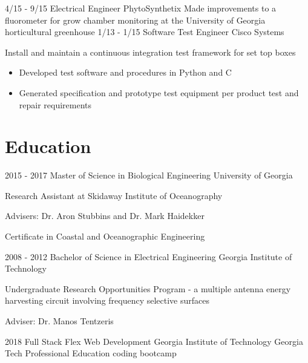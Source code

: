 \documentclass[]{cv}
\begin{document}
\begin{body}
\begin{entrylist}
{		}
		\entry
		{4/15 - 9/15}
		{Electrical Engineer}
		{PhytoSynthetix}
		{Made improvements to a fluorometer for grow chamber monitoring at the University of Georgia horticultural greenhouse}
		\entry
		{1/13 - 1/15}
		{Software Test Engineer}
		{Cisco Systems}
		{Install and maintain a continuous integration test framework for set top boxes
			\begin{itemize}
				\item {Developed test software and procedures in Python and C}
				\item {Generated specification and prototype test equipment per product test and repair requirements}
			\end{itemize}
		}
	\end{entrylist}
	\section{ \vspace{-0.1cm} Education \vspace{0.1cm} }
	\par
	\begin{entrylist}
		\entry
		{2015 - 2017}
		{Master of Science in Biological Engineering}
		{University of Georgia}
		{Research Assistant at Skidaway Institute of Oceanography
			\begin{description}
				\item {Advisers: Dr. Aron Stubbins and Dr. Mark Haidekker}
				\item {Certificate in Coastal and Oceanographic Engineering}
			\end{description}}
		\entry
		{2008 - 2012}
		{Bachelor of Science in Electrical Engineering}
		{Georgia Institute of Technology}
		{
			Undergraduate Research Opportunities Program - a multiple antenna energy harvesting circuit involving frequency selective surfaces
			\begin{description}
				\item {Adviser: Dr. Manos Tentzeris}
			\end{description}
		}
		\entry
		{2018}
		{Full Stack Flex Web Development}
		{Georgia Institute of Technology}
		{Georgia Tech Professional Education coding bootcamp}
	\end{entrylist}
\end{body}
\end{document}
